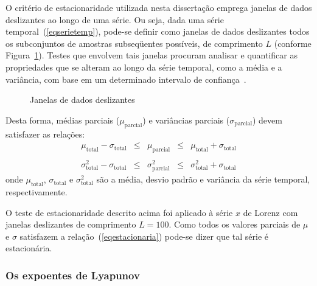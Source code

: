 O critério de estacionaridade utilizada nesta dissertação emprega janelas de dados deslizantes ao longo de uma série. Ou seja, dada uma série temporal~(\ref{eqserietemp}), pode-se definir como janelas de dados deslizantes todos os subconjuntos de amostras subseqüentes possíveis, de comprimento $L$ (conforme Figura~\ref{figestaciogeral}). Testes que envolvem tais janelas procuram analisar e quantificar as propriedades que se alteram ao longo da série temporal, como a média e a variância, com base em um determinado intervalo de confiança~\cite{alvaro/01}.


\begin{figure}[!ht]
\begin{center}
\resizebox{12cm}{!}{}
\caption{Janelas de dados deslizantes} 
\end{center}
\label{figestaciogeral}
\end{figure}
 
Desta forma, médias parciais ($\mu_{\textrm{parcial}}$) e variâncias parciais ($\sigma_{\textrm{parcial}}$) devem satisfazer as relações:
\begin{equation}
\begin{array}{rcccl}
\mu_{\textrm{total}}-\sigma_{\textrm{total}} & \leq  &  \mu_{\textrm{parcial}} & \leq  & \mu_{\textrm{total}}+\sigma_{\textrm{total}}\\
&   &   &   &\\
\sigma_{\textrm{total}}^2-\sigma_{\textrm{total}} & \leq  &  \sigma_{\textrm{parcial}}^2 & \leq  & \sigma_{\textrm{total}}^2+\sigma_{\textrm{total}}
\end{array}
\label{eqestacionaria}
\end{equation} 
onde $\mu_{\textrm{total}}$, $\sigma_{\textrm{total}}$ e $\sigma_{\textrm{total}}^2$ são a média, desvio padrão e variância da série temporal, respectivamente.

O teste de estacionaridade descrito acima foi aplicado à série $x$ de Lorenz com janelas deslizantes de comprimento $L=100$. Como todos os valores parciais de $\mu$ e $\sigma$ satisfazem a relação~(\ref{eqestacionaria}) pode-se dizer que tal série é estacionária.


\subsubsection{Os expoentes de Lyapunov}

